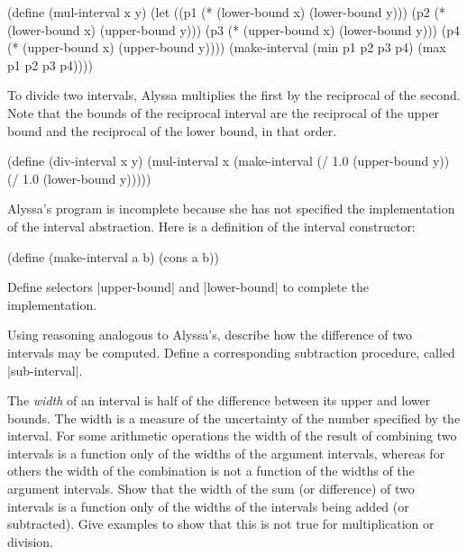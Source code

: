 \begin{Exercise}
\begin{schemedisplay}
(define (mul-interval x y)
  (let ((p1 (* (lower-bound x) (lower-bound y)))
        (p2 (* (lower-bound x) (upper-bound y)))
        (p3 (* (upper-bound x) (lower-bound y)))
        (p4 (* (upper-bound x) (upper-bound y))))
    (make-interval (min p1 p2 p3 p4)
                   (max p1 p2 p3 p4))))
\end{schemedisplay}
To divide two intervals, Alyssa multiplies the first by the reciprocal of
the second.  Note that the bounds of the reciprocal interval are
the reciprocal of the upper bound and the reciprocal of the lower bound, in
that order.

\begin{schemedisplay}
(define (div-interval x y)
  (mul-interval x 
                (make-interval (/ 1.0 (upper-bound y))
                               (/ 1.0 (lower-bound y)))))
\end{schemedisplay}

\begin{Exercise}
\label{exc:2.7}
Alyssa's program is incomplete because she has not specified the
implementation of the interval abstraction.  Here is a definition of
the interval constructor:

\begin{schemedisplay}
(define (make-interval a b) (cons a b))
\end{schemedisplay}
Define selectors \scheme|upper-bound| and \scheme|lower-bound| to complete
the implementation.
\end{Exercise}

\begin{Exercise}
\label{exc:2.8}
Using reasoning analogous to Alyssa's, describe how the difference
of two intervals may be computed.  Define a corresponding subtraction
procedure, called \scheme|sub-interval|.
\end{Exercise}

\begin{Exercise}
\label{exc:2.9}
The \textit{width} of an interval is half of the difference between its
upper and lower bounds.  The width is a measure of the uncertainty of
the number specified by the interval.  For some arithmetic operations
the width of the result of combining two intervals is a function only
of the widths of the argument intervals, whereas for others the width
of the combination is not a function of the widths of the argument
intervals.  Show that the width of the sum (or difference) of two
intervals is a function only of the widths of the intervals being
added (or subtracted).  Give examples to show that this is not true
for multiplication or division.
\end{Exercise}


\end{Exercise}
